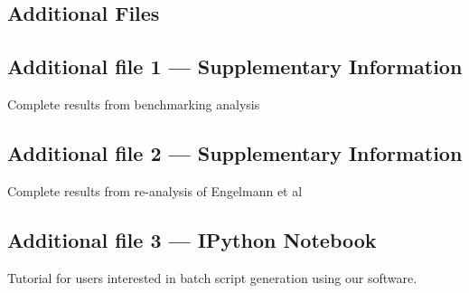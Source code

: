 \documentclass[linenumbers, doublespacing]{bmcart}
\begin{document}
\begin{backmatter}
\section*{Additional Files}
  \subsection*{Additional file 1 --- Supplementary Information}
	Complete results from benchmarking analysis
  \subsection*{Additional file 2 --- Supplementary Information}
    Complete results from re-analysis of Engelmann et al
  \subsection*{Additional file 3 --- IPython Notebook}
    Tutorial for users interested in batch script generation using our software. 


\end{backmatter}
\end{document}
